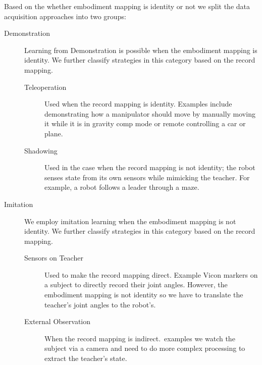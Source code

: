 \begin{enumerate}
\begin{description}
            Based on the whether embodiment mapping is identity or not we split
            the data acquisition approaches into two groups:
            \begin{description} 
                \item[Demonstration] 
                    Learning from Demonstration is possible when the embodiment
                    mapping is identity. We further classify strategies in this
                    category based on the record mapping.
                    \begin{description} 
                        \item[Teleoperation] 
                            Used when the record mapping is identity. Examples
                            include demonstrating how a manipulator should move
                            by manually moving it while it is in gravity comp
                            mode or remote controlling a car or plane. 
                        \item[Shadowing] 
                            Used in the case when the record mapping is not
                            identity; the robot senses state from its own
                            sensors while mimicking the teacher.  For example, a
                            robot follows a leader through a maze.
                    \end{description} 
                \item[Imitation] 
                    We employ imitation learning when the embodiment mapping is
                    not identity. We further classify strategies in this
                    category based on the record mapping.
                    \begin{description} 
                        \item[Sensors on Teacher] 
                            Used to make the record mapping direct. Example
                            Vicon markers on a subject to directly record their
                            joint angles. However, the embodiment mapping is
                            not identity so we have to translate the teacher's
                            joint angles to the robot's.
                        \item[External Observation] 
                            When the record mapping is indirect.\ examples we
                            watch the subject via a camera and need to do more
                            complex processing to extract the teacher's state.

\end{description}
\end{description}
\end{description}
\end{enumerate}
